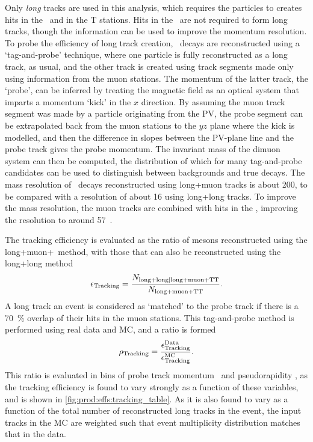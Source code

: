 Only \emph{long} tracks are used in this analysis, which requires the particles 
to creates hits in the \velo\ and in the T stations.
Hits in the \ttracker\ are not required to form long tracks, though the 
information can be used to improve the momentum resolution.
To probe the efficiency of long track creation, \JpsiTomumu\ decays are 
reconstructed using a `tag-and-probe' technique, where one particle is fully 
reconstructed as a long track, as usual, and the other track is created using 
track segments made only using information from the muon stations.
The momentum of the latter track, the `probe', can be inferred by treating the 
magnetic field as an optical system that imparts a momentum `kick' in the $x$ 
direction.
By assuming the muon track segment was made by a particle originating from the 
\ac{PV}, the probe segment can be extrapolated back from the muon stations to 
the $yz$ plane where the kick is modelled, and then the difference in slopes 
between the \ac{PV}-plane line and the probe track gives the probe momentum.
The invariant mass of the dimuon system can then be computed, the distribution 
of which for many tag-and-probe candidates can be used to distinguish between 
backgrounds and true \PJpsi decays.
The mass resolution of \JpsiTomumu\ decays reconstructed using long+muon tracks 
is about \SI{200}{\MeVcc}, to be compared with a resolution of about 
\SI{16}{\MeVcc} using long+long tracks.
To improve the mass resolution, the muon tracks are combined with hits in the 
\ttracker, improving the resolution to around 
\SI{57}{\MeVcc}~\cite{Aaij:2014pwa,DeCian:2013zua}.

The tracking efficiency is evaluated as the ratio of \PJpsi mesons 
reconstructed using the long+muon+\ttracker\ method, with those that can also 
be reconstructed using the long+long method
\begin{equation}
  \eff_{\text{Tracking}} = 
  \frac{%
    N_{\text{long+long|long+muon+TT}}
  }{%
    N_{\text{long+muon+TT}}
  }.
  \label{eqn:prod:effs:tracking_eff}
\end{equation}
A long track an event is considered as `matched' to the probe track if there is 
a \SI{70}{\percent} overlap of their hits in the muon stations.
This tag-and-probe method is performed using real data and \ac{MC}, and a ratio 
is formed
\begin{equation}
  \efftracking = \frac{%
    \eff_{\text{Tracking}}^{\text{Data}}
  }{%
    \eff_{\text{Tracking}}^{\text{MC}}
  }.
  \label{eqn:prod:effs:tracking_ratio}
\end{equation}
This ratio is evaluated in bins of probe track momentum \ptot\ and 
pseudorapidity \Eta, as the tracking efficiency is found to vary strongly as a 
function of these variables, and is shown in 
\cref{fig:prod:effs:tracking_table}.
As it is also found to vary as a function of the total number of reconstructed 
long tracks in the event, the input tracks in the \ac{MC} are weighted such 
that event multiplicity distribution matches that in the data.

